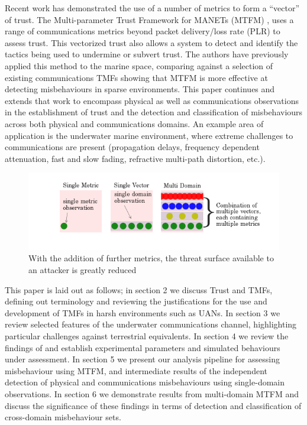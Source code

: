 \documentclass{aamas2016}
\begin{document}
Recent work has demonstrated the use of a number of metrics to form a ``vector'' of trust. The Multi-parameter Trust Framework for MANETs (MTFM) \cite{Guo11}, uses a range of communications metrics beyond packet delivery/loss rate (PLR) to assess trust. This vectorized trust also allows a system to detect and identify the tactics being used to undermine or subvert trust. The authors have previously applied this method to the marine space, comparing against a selection of existing communications TMFs \cite{Bolster2015} showing that MTFM is more effective at detecting misbehaviours in sparse environments. This paper continues and extends that work to encompass physical as well as communications observations in the establishment of trust and the detection and classification of misbehaviours across both physical and communications domains. 
An example area of application is the underwater marine environment, where extreme challenges to communications are present (propagation delays, frequency dependent attenuation, fast and slow fading, refractive multi-path distortion, etc.).
\begin{figure}[h!]
	\centering
	\includegraphics[width=\linewidth]{threat_surface_sum}
	
	\caption{With the addition of further metrics, the threat surface available to an attacker is greatly reduced}
\end{figure}

This paper is laid out as follows; in section 2 we discuss Trust and TMFs, defining out terminology and reviewing the justifications for the use and development of TMFs in harsh environments such as UANs.
In section 3 we review selected features of the underwater communications channel, highlighting particular challenges against terrestrial equivalents. 
In section 4 we review the findings of \cite{Bolster2015} and establish experimental parameters and simulated behaviours under assessment. 
In section 5 we present our analysis pipeline for assessing misbehaviour using MTFM, and intermediate results of the independent detection of physical and communications misbehaviours using single-domain observations. 
In section 6 we demonstrate results from multi-domain MTFM and discuss the significance of these findings in terms of detection and classification of cross-domain misbehaviour sets.
\end{document}
